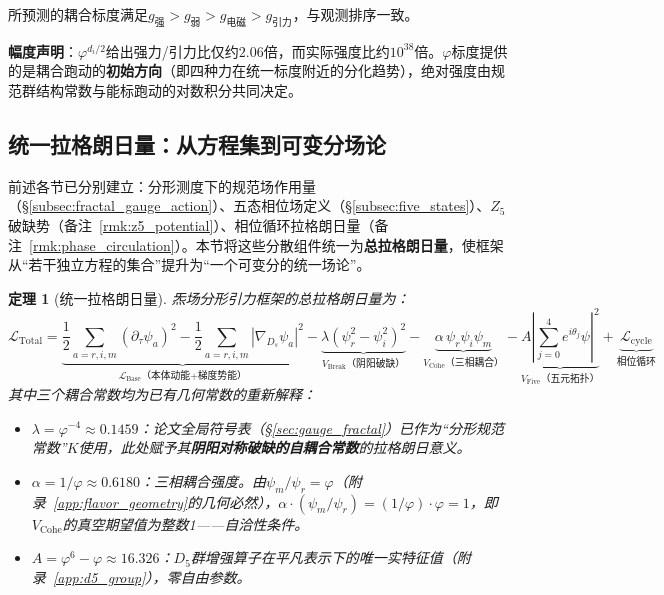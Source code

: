 \documentclass[12pt,a4paper,twocolumn]{article}
\renewcommand{\phi}{\varphi}
\newtheorem{theorem}{定理}[section]
\begin{document}
所预测的耦合标度满足$g_{\text{强}} > g_{\text{弱}} > g_{\text{电磁}} > g_{\text{引力}}$，与观测排序一致。

\textbf{幅度声明}：$\phi^{d_i/2}$给出强力/引力比仅约$2.06$倍，而实际强度比约$10^{38}$倍。$\phi$标度提供的是耦合跑动的\textbf{初始方向}（即四种力在统一标度附近的分化趋势），绝对强度由规范群结构常数与能标跑动的对数积分共同决定。

\subsection{统一拉格朗日量：从方程集到可变分场论}
\label{subsec:total_lagrangian}

前述各节已分别建立：分形测度下的规范场作用量（§\ref{subsec:fractal_gauge_action}）、五态相位场定义（§\ref{subsec:five_states}）、$Z_5$破缺势（备注~\ref{rmk:z5_potential}）、相位循环拉格朗日量（备注~\ref{rmk:phase_circulation}）。本节将这些分散组件统一为\textbf{总拉格朗日量}，使框架从``若干独立方程的集合''提升为``一个可变分的统一场论''。

\begin{theorem}[统一拉格朗日量]
\label{thm:total_lagrangian}
炁场分形引力框架的总拉格朗日量为：
\begin{equation}
\mathcal{L}_{\text{Total}} = \underbrace{\frac{1}{2}\sum_{a=r,i,m}(\partial_\tau\psi_a)^2 - \frac{1}{2}\sum_{a=r,i,m}|\nabla_{D_s}\psi_a|^2}_{\mathcal{L}_{\text{Base}}\text{（本体动能+梯度势能）}} - \underbrace{\lambda(\psi_r^2 - \psi_i^2)^2}_{V_{\text{Break}}\text{（阴阳破缺）}} - \underbrace{\alpha\,\psi_r\psi_i\psi_m}_{V_{\text{Cohe}}\text{（三相耦合）}} - \underbrace{A\left|\sum_{j=0}^4 e^{i\theta_j}\psi\right|^2}_{V_{\text{Five}}\text{（五元拓扑）}} + \underbrace{\mathcal{L}_{\text{cycle}}}_{\text{相位循环}}
\end{equation}
其中三个耦合常数均为已有几何常数的重新解释：
\begin{itemize}
\item $\lambda = \phi^{-4} \approx 0.1459$：论文全局符号表（§\ref{sec:gauge_fractal}）已作为``分形规范常数''$K$使用，此处赋予其\textbf{阴阳对称破缺的自耦合常数}的拉格朗日意义。
\item $\alpha = 1/\phi \approx 0.6180$：三相耦合强度。由$\psi_m/\psi_r = \phi$（附录~\ref{app:flavor_geometry}的几何必然），$\alpha \cdot (\psi_m/\psi_r) = (1/\phi)\cdot\phi = 1$，即$V_{\text{Cohe}}$的真空期望值为整数1——自洽性条件。
\item $A = \phi^6 - \phi \approx 16.326$：$D_5$群增强算子在平凡表示下的唯一实特征值（附录~\ref{app:d5_group}），零自由参数。
\end{itemize}
\end{theorem}
\end{document}
